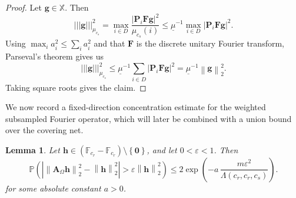 \documentclass{article}
\theoremstyle{plain}
\newtheorem{lemma}[theorem]{Lemma}
\theoremstyle{definition}
\theoremstyle{remark}
\newcommand*{\snorm}[2]{\left\vert\!\left\vert\!\left\vert #1 \right\vert\!\right\vert\!\right\vert_{#2}}
\begin{document}
\begin{proof}
  Let $\mathbf g \in \mathbb X$. Then
  \[
    \snorm{\mathbf g}{\mu_{c_s}}^2
    =
    \max_{i \in D}
    \frac{\left|\mathbf P_i\mathbf F\mathbf g\right|^2}{\mu_{c_s}\left(i\right)}
    \leq
    \underline{\mu}^{-1}
    \max_{i \in D}
    \left|\mathbf P_i\mathbf F\mathbf g\right|^2.
  \]
  Using $\max_i a_i^2 \leq \sum_i a_i^2$ and that $\mathbf{F}$ is the discrete unitary Fourier transform, Parseval's theorem gives us
  \[
    \snorm{\mathbf g}{\mu_{c_s}}^2
    \leq
    \underline{\mu}^{-1}
    \sum_{i \in D}
    \left|\mathbf P_i\mathbf F\mathbf g\right|^2
    =
    \underline{\mu}^{-1}
    \left\|\mathbf g\right\|_2^2.
  \]
  Taking square roots gives the claim.
\end{proof}

We now record a fixed-direction concentration estimate for the weighted subsampled Fourier operator, which will later be combined with a union bound over the covering net.

\begin{lemma}
  \label{lem:fixed-direction}
  Let $\mathbf{h}\in \left(\mathbb{F}_{c_r}-\mathbb{F}_{c_r}\right)\setminus\left\{\mathbf{0}\right\}$, and let $0<\varepsilon<1$. Then
  \[
    \mathbb{P}\left(
      \left|
      \left\|\mathbf{A}_\Omega\mathbf{h}\right\|_2^2
      -
      \left\|\mathbf{h}\right\|_2^2
      \right|
      >
      \varepsilon\left\|\mathbf{h}\right\|_2^2
    \right)
    \leq
    2\exp\left(-a\,\frac{m\varepsilon^2}{\Lambda\left(c_r,c_r,c_s\right)}\right).
  \]
  for some absolute constant $a > 0$.
\end{lemma}
\end{document}
